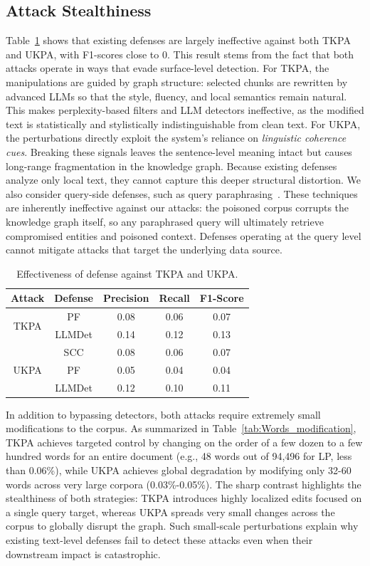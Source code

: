 \documentclass[letterpaper]{article} %
\begin{document}
\subsection{Attack Stealthiness}
Table~\ref{tab:defense_evaluation} shows that existing defenses are largely ineffective against both TKPA and UKPA, with F1-scores close to 0.
This result stems from the fact that both attacks operate in ways that evade surface-level detection.
For TKPA, the manipulations are guided by graph structure: selected chunks are rewritten by advanced LLMs so that the style, fluency, and local semantics remain natural.
This makes perplexity-based filters and LLM detectors ineffective, as the modified text is statistically and stylistically indistinguishable from clean text.
For UKPA, the perturbations directly exploit the system's reliance on \emph{linguistic coherence cues}.
Breaking these signals leaves the sentence-level meaning intact but causes long-range fragmentation in the knowledge graph.
Because existing defenses analyze only local text, they cannot capture this deeper structural distortion.
We also consider query-side defenses, such as query paraphrasing~\cite{DBLP:journals/corr/abs-2309-00614}.
These techniques are inherently ineffective against our attacks: the poisoned corpus corrupts the knowledge graph itself, so any paraphrased query will ultimately retrieve compromised entities and poisoned context.
Defenses operating at the query level cannot mitigate attacks that target the underlying data source.

\begin{table}[t]
\centering
\small
\begin{tabular}{ccccc}
\toprule
\textbf{Attack} & \textbf{Defense} & \textbf{Precision} & \textbf{Recall} & \textbf{F1-Score} \\
\midrule
\multirow{2}{*}{TKPA}
& PF      & 0.08 & 0.06 & 0.07 \\
& LLMDet     & 0.14 & 0.12 & 0.13 \\
\midrule
\multirow{3}{*}{UKPA}
& SCC & 0.08 & 0.06 & 0.07 \\     
& PF      & 0.05 & 0.04 & 0.04 \\
& LLMDet     & 0.12 & 0.10 & 0.11 \\
\bottomrule
\end{tabular}
\caption{Effectiveness of defense against TKPA and UKPA.}
\label{tab:defense_evaluation}
\end{table}

In addition to bypassing detectors, both attacks require extremely small modifications to the corpus.
As summarized in Table~\ref{tab:Words_modification}, TKPA achieves targeted control by changing on the order of a few dozen to a few hundred words for an entire document (e.g., 48 words out of 94,496 for LP, less than 0.06\%),
while UKPA achieves global degradation by modifying only 32-60 words across very large corpora (0.03\%-0.05\%).
The sharp contrast highlights the stealthiness of both strategies: TKPA introduces highly localized edits focused on a single query target, whereas UKPA spreads very small changes across the corpus to globally disrupt the graph.
Such small-scale perturbations explain why existing text-level defenses fail to detect these attacks even when their downstream impact is catastrophic.
\end{document}
